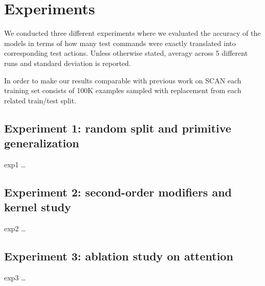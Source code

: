 \section{Experiments}
\label{sec:intro}

We conducted three different experiments where we evaluated the accuracy of the models in terms of how many test commands were exactly translated
into corresponding test actions. Unless otherwise stated, averagy across 5 different runs and standard deviation is reported.

In order to make our results comparable with previous work on SCAN each training set consists of 100K examples sampled with replacement
from each related train/test split.

\subsection{Experiment 1: random split and primitive generalization}
\label{subsec:exp1}

exp1 \dots

\subsection{Experiment 2: second-order modifiers and kernel study}
\label{subsec:exp2}

exp2 \dots

\subsection{Experiment 3: ablation study on attention}
\label{subsec:exp3}

exp3 \dots


